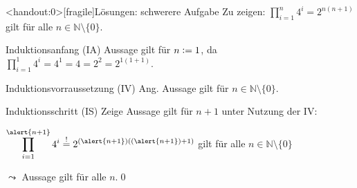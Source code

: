 {\begin{frame}<handout:0>[fragile]{Lösungen: schwerere Aufgabe}
     Zu zeigen: $\displaystyle\prod_{i=1}^{n} 4^i = 2^{n(n+1)}$ gilt für alle $n \in \mathbb{N}\setminus \{0\}$.
    \begin{alertblock}{Induktionsanfang (IA)}
        Aussage gilt für $n\vcentcolon= 1$, da $\displaystyle\prod_{i=1}^{1} 4^i = 4^1 = 4 = 2^2 = 2^{1(1+1)}$.
    \end{alertblock}
    \begin{alertblock}{Induktionsvorraussetzung (IV)}
        Ang. Aussage gilt für $n \in\mathbb{N}\setminus \{0\}$.
    \end{alertblock}
    \begin{alertblock}{Induktionsschritt (IS)}
        Zeige Aussage gilt für $n+1$ unter Nutzung der IV:\par
        $\displaystyle\prod_{i=1}^{\alert{n+1}} 4^i \overset{!}{=} 2^{(\alert{n+1})((\alert{n+1})+1)}$ gilt für alle $n \in \mathbb{N}\setminus \{0\}$
    \end{alertblock}
    \alert{$\leadsto$ Aussage gilt für alle $n$.}\qed
\end{frame}
}

